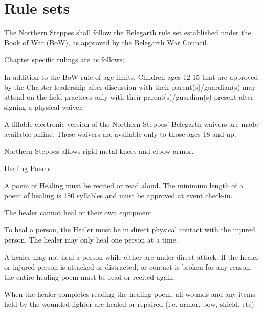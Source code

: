 \documentclass[12pt]{article}
\begin{document}
\section{Rule sets}
\begin{level}
    \item The Northern Steppes shall follow the Belegarth rule set established under the Book of War (BoW), as approved by the Belegarth War Council.
    \item Chapter specific rulings are as follows;
    \begin{level}
        \item In addition to the BoW rule of age limits, Children ages 12-15 that are approved by the
Chapter leadership after discussion with their parent(s)/guardian(s) may attend on the
field practices only with their parent(s)/guardian(s) present after signing a physical waiver.
        \item A fillable electronic version of the Northern Steppes' Belegarth waivers are made
available online. These waivers are available only to those ages 18 and up.
        \item Northern Steppes allows rigid metal knees and elbow armor.
        \item Healing Poems
        \begin{level}
            \item A poem of Healing must be recited or read aloud. The minimum length of a poem of healing is 180 syllables and must be approved at event check-in.
            \item The healer cannot heal  or their own equipment
            \item To heal a person, the Healer must be in direct physical contact with the injured person. The healer may only heal one person at a time.
            \item A healer may not heal a person while either are under direct attack. If the healer or injured person is attacked or distracted, or contact is broken for any reason, the entire healing poem must be read or recited again.
            \item When the healer completes reading the healing poem, all wounds and any items held by the wounded fighter are healed or repaired (i.e. armor, bow, shield, etc)
        \end{level}
    \end{level}
\end{level}
\end{document}
